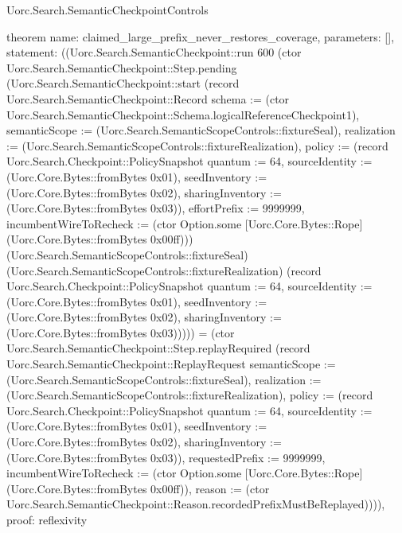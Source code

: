\begin{lexlean}{Uorc.Search.SemanticCheckpointControls}
\begin{semanticmodule}
theorem{
  name: claimed_large_prefix_never_restores_coverage,
  parameters: [],
  statement: ((Uorc.Search.SemanticCheckpoint::run 600 (ctor Uorc.Search.SemanticCheckpoint::Step.pending (Uorc.Search.SemanticCheckpoint::start (record Uorc.Search.SemanticCheckpoint::Record {schema := (ctor Uorc.Search.SemanticCheckpoint::Schema.logicalReferenceCheckpoint1), semanticScope := (Uorc.Search.SemanticScopeControls::fixtureSeal), realization := (Uorc.Search.SemanticScopeControls::fixtureRealization), policy := (record Uorc.Search.Checkpoint::PolicySnapshot {quantum := 64, sourceIdentity := (Uorc.Core.Bytes::fromBytes 0x01), seedInventory := (Uorc.Core.Bytes::fromBytes 0x02), sharingInventory := (Uorc.Core.Bytes::fromBytes 0x03)}), effortPrefix := 9999999, incumbentWireToRecheck := (ctor Option.some [Uorc.Core.Bytes::Rope] (Uorc.Core.Bytes::fromBytes 0x00ff))}) (Uorc.Search.SemanticScopeControls::fixtureSeal) (Uorc.Search.SemanticScopeControls::fixtureRealization) (record Uorc.Search.Checkpoint::PolicySnapshot {quantum := 64, sourceIdentity := (Uorc.Core.Bytes::fromBytes 0x01), seedInventory := (Uorc.Core.Bytes::fromBytes 0x02), sharingInventory := (Uorc.Core.Bytes::fromBytes 0x03)})))) = (ctor Uorc.Search.SemanticCheckpoint::Step.replayRequired (record Uorc.Search.SemanticCheckpoint::ReplayRequest {semanticScope := (Uorc.Search.SemanticScopeControls::fixtureSeal), realization := (Uorc.Search.SemanticScopeControls::fixtureRealization), policy := (record Uorc.Search.Checkpoint::PolicySnapshot {quantum := 64, sourceIdentity := (Uorc.Core.Bytes::fromBytes 0x01), seedInventory := (Uorc.Core.Bytes::fromBytes 0x02), sharingInventory := (Uorc.Core.Bytes::fromBytes 0x03)}), requestedPrefix := 9999999, incumbentWireToRecheck := (ctor Option.some [Uorc.Core.Bytes::Rope] (Uorc.Core.Bytes::fromBytes 0x00ff)), reason := (ctor Uorc.Search.SemanticCheckpoint::Reason.recordedPrefixMustBeReplayed)}))),
  proof: reflexivity{}
}


\end{semanticmodule}
\end{lexlean}
